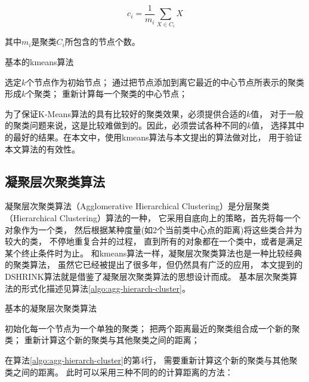 \begin{equation}
    c_i = \frac{1}{m_i} \sum_{X \in C_i} X
\end{equation}

其中$m_i$是聚类$C_i$所包含的节点个数。

\begin{algorithm}[htb]
    \caption{基本的kmeans算法}
    \label{algo:kmeans}
    \begin{algorithmic}[1]
        \State 选定$k$个节点作为初始节点；
        \Repeat
            \State 通过把节点添加到离它最近的中心节点所表示的聚类形成$k$个聚类；
            \State 重新计算每一个聚类的中心节点；
    \end{algorithmic}
\end{algorithm}

为了保证K-Means算法的具有比较好的聚类效果，必须提供合适的$k$值，
对于一般的聚类问题来说，这是比较难做到的。因此，必须尝试各种不同的$k$值，
选择其中的最好的结果。在本文中，使用kmeans算法与本文提出的算法做对比，
用于验证本文算法的有效性。

\subsection{凝聚层次聚类算法}

凝聚层次聚类算法（Agglomerative Hierarchical Clustering）是分层聚类（Hierarchical Clustering）算法的一种，
它采用自底向上的策略，首先将每一个对象作为一个类，
然后根据某种度量(如2个当前类中心点的距离)将这些类合并为较大的类，
不停地重复合并的过程，
直到所有的对象都在一个类中，或者是满足某个终止条件时为止。
和kmeans算法一样，凝聚层次聚类算法也是一种比较经典的聚类算法，
虽然它已经被提出了很多年，但仍然具有广泛的应用，
本文提到的DSHRINK算法就是借鉴了凝聚层次聚类算法的思想设计而成。
基本层次聚类算法的形式化描述见算法\ref{algo:agg-hierarch-cluster}。

\begin{algorithm}[htb]
    \caption{基本的凝聚层次聚类算法}
    \label{algo:agg-hierarch-cluster}
    \begin{algorithmic}[1]
        \State 初始化每一个节点为一个单独的聚类；
        \Repeat
            \State 把两个距离最近的聚类组合成一个新的聚类；
            \State 重新计算这个新的聚类与其他聚类之间的距离；
    \end{algorithmic}
\end{algorithm}

在算法\ref{algo:agg-hierarch-cluster}的第4行，
需要重新计算这个新的聚类与其他聚类之间的距离。
此时可以采用三种不同的的计算距离的方法：

